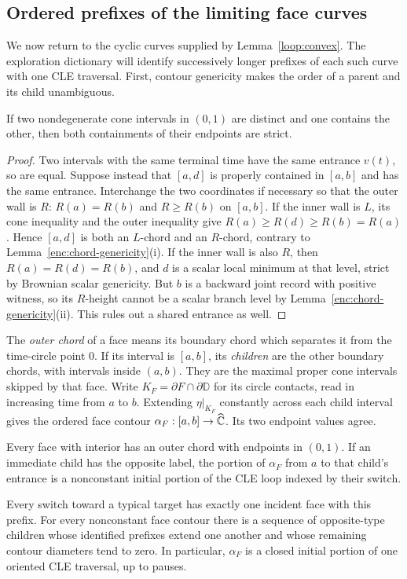 \subsection{Ordered prefixes of the limiting face curves}

We now return to the cyclic curves supplied by
Lemma~\ref{loop:convex}.  The exploration dictionary will identify
successively longer prefixes of each such curve with one CLE
traversal.  First, contour genericity makes the order of a parent
and its child unambiguous.

\begin{lemma}
\label{loop:strict-endpoints}
If two nondegenerate cone intervals in $(0,1)$ are distinct and one
contains the other, then both containments of their endpoints are strict.
\end{lemma}

\begin{proof}
Two intervals with the same terminal time have the same entrance
$v(t)$, so are equal.  Suppose instead that $[a,d]$ is properly
contained in $[a,b]$ and has the same entrance.  Interchange the two
coordinates if necessary so that the outer wall is $R$:
$R(a)=R(b)$ and $R\ge R(b)$ on $[a,b]$.
If the inner wall is $L$, its cone inequality and the outer inequality
give $R(a)\ge R(d)\ge R(b)=R(a)$.  Hence $[a,d]$ is both an
$L$-chord and an $R$-chord, contrary to
Lemma~\ref{enc:chord-genericity}(i).
If the inner wall is also $R$, then
$R(a)=R(d)=R(b)$, and $d$ is a scalar local minimum at that level,
strict by Brownian scalar genericity.
But $b$ is a backward joint record with positive witness, so its
$R$-height cannot be a scalar branch level by
Lemma~\ref{enc:chord-genericity}(ii).  This rules out a shared entrance
as well.
\end{proof}

The \emph{outer chord} of a face means its boundary chord which separates
it from the time-circle point $0$.  If its interval is $[a,b]$, its
\emph{children} are the other boundary chords, with intervals inside
$(a,b)$.  They are the maximal proper cone intervals skipped by that
face.  Write $K_F=\partial F\cap\partial\mathbb D$ for its circle
contacts, read in increasing time from $a$ to $b$.  Extending
$\eta|_{K_F}$ constantly across each child interval gives the ordered
face contour $\alpha_F:[a,b]\to\widehat{\mathbb C}$.  Its two endpoint values agree.

\begin{lemma}\label{loop:prefixes}
Every face with interior has an outer chord with endpoints in $(0,1)$.
If an immediate child has the opposite label, the portion of
$\alpha_F$ from $a$ to that child's entrance is a nonconstant initial
portion of the CLE loop indexed by their switch.

Every switch toward a typical target has exactly one incident face
with this prefix.  For every nonconstant face contour there is a
sequence of opposite-type children whose identified prefixes extend
one another and whose remaining contour diameters tend to zero.
In particular, $\alpha_F$ is a closed initial portion of one oriented
CLE traversal, up to pauses.
\end{lemma}

